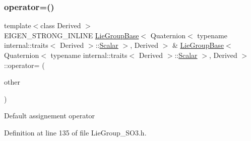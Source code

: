\subsubsection{\texorpdfstring{operator=()}{operator=()}\hspace{0.1cm}{\footnotesize\ttfamily [1/3]}}
{\footnotesize\ttfamily template$<$class Derived $>$ \\
E\+I\+G\+E\+N\+\_\+\+S\+T\+R\+O\+N\+G\+\_\+\+I\+N\+L\+I\+NE \hyperlink{class_lie_group_base}{Lie\+Group\+Base}$<$ Quaternion$<$ typename internal\+::traits$<$ Derived $>$\+::\hyperlink{class_lie_group_base_3_01_quaternion_3_01typename_01internal_1_1traits_3_01_derived_01_4_1_1_scalar_01_4_00_01_derived_01_4_afadeceb3b98e52deecc572e71efb82a8}{Scalar} $>$, Derived $>$ \& \hyperlink{class_lie_group_base}{Lie\+Group\+Base}$<$ Quaternion$<$ typename internal\+::traits$<$ Derived $>$\+::\hyperlink{class_lie_group_base_3_01_quaternion_3_01typename_01internal_1_1traits_3_01_derived_01_4_1_1_scalar_01_4_00_01_derived_01_4_afadeceb3b98e52deecc572e71efb82a8}{Scalar} $>$, Derived $>$\+::operator= (\begin{DoxyParamCaption}\item[{const \hyperlink{class_lie_group_base}{Lie\+Group\+Base}$<$ Quaternion$<$ typename internal\+::traits$<$ Derived $>$\+::\hyperlink{class_lie_group_base_3_01_quaternion_3_01typename_01internal_1_1traits_3_01_derived_01_4_1_1_scalar_01_4_00_01_derived_01_4_afadeceb3b98e52deecc572e71efb82a8}{Scalar} $>$, Derived $>$ \&}]{other }\end{DoxyParamCaption})}

Default assignement operator 

Definition at line 135 of file Lie\+Group\+\_\+\+S\+O3.\+h.

\hypertarget{class_lie_group_base_3_01_quaternion_3_01typename_01internal_1_1traits_3_01_derived_01_4_1_1_scalar_01_4_00_01_derived_01_4_ab539e1018951e99410e0e9d417f9ccbf}{}\label{class_lie_group_base_3_01_quaternion_3_01typename_01internal_1_1traits_3_01_derived_01_4_1_1_scalar_01_4_00_01_derived_01_4_ab539e1018951e99410e0e9d417f9ccbf} 

